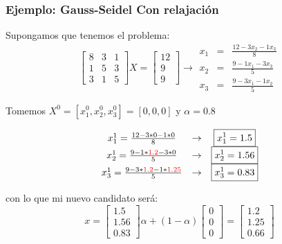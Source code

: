 \documentclass[xcolor=svgnames]{beamer} %
\theoremstyle{plain}
\theoremstyle{definition}
\begin{document}
\begin{frame}
  \frametitle{Ejemplo: Gauss-Seidel Con relajación}
	Supongamos que tenemos el problema:
$$  \begin{bmatrix}
8 & 3 & 1 \\
1 & 5 & 3 \\
3 & 1 & 5
\end{bmatrix} X = \begin{bmatrix}
12\\
9\\
9
\end{bmatrix} \rightarrow \begin{array}{ccc}
x_1 &=& \frac{12-3x_2-1x_3}{8}\\
x_2 &=& \frac{9-1x_1-3x_3}{5}\\
x_3 &=& \frac{9-3x_1-1x_2}{5}
\end{array}$$

Tomemos $X^0 = [x_1^0,x_2^0,x_3^0] = [0,0,0]$ y $ \alpha =0.8 $

\begin{minipage}{.55\linewidth}
\pause
\small
$$\begin{array}{ccc}
x_1^1 = \frac{12-3*0-1*0}{8} &\rightarrow & \boxed{x_1^1 = 1.5}\\
x_2^1 = \frac{9-1*{\color{red}1.2}-3*0}{5} &\rightarrow & \boxed{x_2^1 = 1.56}\\
x_3^1 = \frac{9-3*{\color{red}1.2}-1*{\color{red}1.25}}{5} &\rightarrow & \boxed{x_3^1 = 0.83}
\end{array}$$

\end{minipage} \vrule \begin{minipage}{.4\linewidth}
con lo que mi nuevo candidato será:
\small
$$x = \begin{bmatrix}
1.5\\
1.56\\
0.83
\end{bmatrix} \alpha + (1-\alpha)\begin{bmatrix}
0\\
0\\
0
\end{bmatrix} = \begin{bmatrix}
1.2\\
1.25\\
0.66
\end{bmatrix}$$

\end{minipage}
\end{frame}
\end{document}
